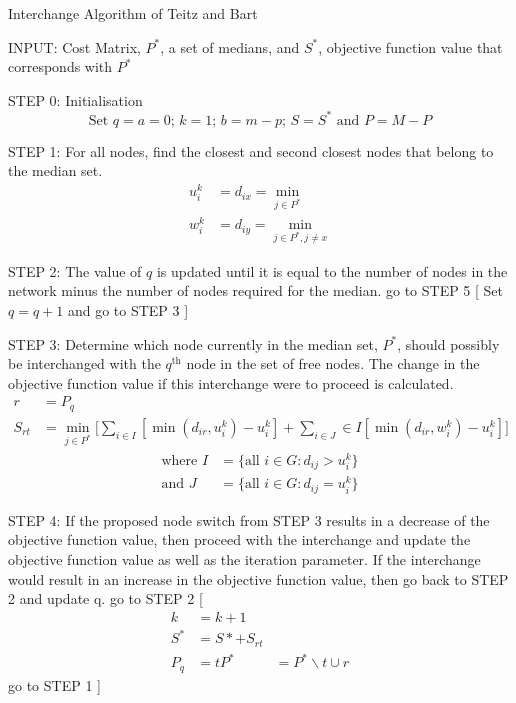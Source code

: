 \documentclass[11pt]{article}
\begin{document}
\begin{algorithm}
	\caption{Interchange Algorithm of Teitz and Bart}
	\begin{algorithmic}[0]
		\Statex 
		\Statex INPUT: Cost Matrix, $P^*$, a set of medians, and $S^*$, objective function value that corresponds with $P^*$
		
		\Statex 
		\Statex STEP 0: Initialisation 	
		\begin{equation*}
			\text{Set } q=a=0 \text{; } k=1 \text{; } b=m-p \text{; } S=S^* \text{ and } P = M - P
		\end{equation*}
		
		\Statex 
		\Statex STEP 1: For all nodes, find the closest and second closest nodes that belong to the median set.
		\begin{align*}
			u_i^k &= d_{ix} = \min_{j\in P^*}\\
			w_i^k &= d_{iy} = \min_{j\in P^*, j\neq x}
		\end{align*} 
		
		\Statex 
		\Statex STEP 2: The value of $q$ is updated until it is equal to the number of nodes in the network minus the number of nodes required for the median.
		\Statex go to STEP 5
		[
		\Else
		\Statex Set $q=q+1$ and go to STEP 3
		]
		\EndIf
		
		\Statex 
		\Statex STEP 3: Determine which node currently in the median set, $P^*$, should possibly be interchanged with the $q^{\text{th}}$ node in the set of free nodes.  The change in the objective function value if this interchange were to proceed is calculated.
		\begin{align*}
			r &= P_q\\
			S_{rt} & = \min_{j\in P^*}\big[\sum_{i\in I}[\min(d_{ir},u_i^k)-u_i^k] + \sum_{i\in J}\in I[\min(d_{ir},w_i^k)-u_i^k] \big]
		\end{align*}
		\begin{align*}
			\text{where } I & = \{\text{all } i \in G: d_{ij} > u_i^k\}\\
			\text{and } J & = \{\text{all } i \in G: d_{ij} = u_i^k\}
		\end{align*}
		
		\Statex 
		\Statex STEP 4: If the proposed node switch from STEP 3 results in a decrease of the objective function value, then proceed with the interchange and update the objective function value as well as the  iteration parameter.  If the interchange would result in an increase in the objective function value, then go back to STEP 2 and update q.
		\Statex go to STEP 2
		[
		\begin{align*}
			k &= k+1\\
			S^* &= S* + S_{rt}\\
			P_q &= t
			P^* & = P^*\backslash {t} \cup {r}		
		\end{align*}
		\Statex go to STEP 1				
		]
		\EndIf
		

\end{algorithmic}
\end{algorithm}
\end{document}
